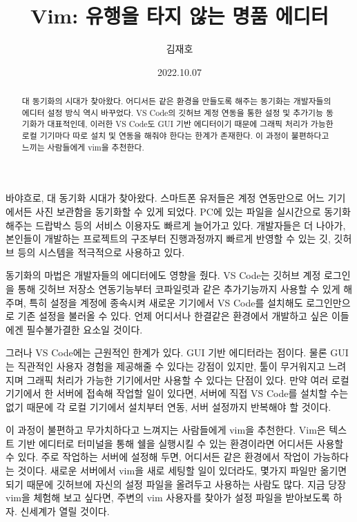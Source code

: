 \documentclass[11pt, oneside]{article}   	%
\title{Vim: 유행을 타지 않는 명품 에디터}
\author{김재호}
\date{2022.10.07}
\begin{document}
\maketitle


\begin{abstract}
    대 동기화의 시대가 찾아왔다. 어디서든 같은 환경을 만들도록 해주는 동기화는 개발자들의 에디터
    설정 방식 역시 바꾸었다. VS Code의 깃허브 계정 연동을 통한 설정 및 추가기능 동기화가 대표적인데,
    이러한 VS Code도 GUI 기반 에디터이기 때문에 그래픽 처리가 가능한 로컬 기기마다 따로 설치
    및 연동을 해줘야 한다는 한계가 존재한다. 이 과정이 불편하다고 느끼는 사람들에게 vim을 추천한다.
\end{abstract}

바야흐로, 대 동기화 시대가 찾아왔다. 스마트폰 유저들은 계정 연동만으로 어느 기기에서든 사진
보관함을 동기화할 수 있게 되었다. PC에 있는 파일을 실시간으로 동기화해주는 드랍박스 등의 서비스
이용자도 빠르게 늘어가고 있다. 개발자들은 더 나아가, 본인들이 개발하는 프로젝트의 구조부터
진행과정까지 빠르게 반영할 수 있는 깃, 깃허브 등의 시스템을 적극적으로 사용하고 있다.

동기화의 마법은 개발자들의 에디터에도 영향을 줬다. VS Code는 깃허브 계정 로그인을 통해 깃허브
저장소 연동기능부터 코파일럿과 같은 추가기능까지 사용할 수 있게 해주며, 특히 설정을 계정에 종속시켜
새로운 기기에서 VS Code를 설치해도 로그인만으로 기존 설정을 불러올 수 있다. 언제 어디서나 한결같은
환경에서 개발하고 싶은 이들에겐 필수불가결한 요소일 것이다.

그러나 VS Code에는 근원적인 한계가 있다. GUI 기반 에디터라는 점이다. 물론 GUI는 직관적인 사용자
경험을 제공해줄 수 있다는 강점이 있지만, 툴이 무거워지고 느려지며 그래픽 처리가 가능한 기기에서만
사용할 수 있다는 단점이 있다. 만약 여러 로컬 기기에서 한 서버에 접속해 작업할 일이 있다면, 서버에
직접 VS Code를 설치할 수는 없기 때문에 각 로컬 기기에서 설치부터 연동, 서버 설정까지 반복해야
할 것이다.

이 과정이 불편하고 무가치하다고 느껴지는 사람들에게 vim을 추천한다. Vim은 텍스트 기반 에디터로
터미널을 통해 쉘을 실행시킬 수 있는 환경이라면 어디서든 사용할 수 있다. 주로 작업하는 서버에
설정해 두면, 어디서든 같은 환경에서 작업이 가능하다는 것이다. 새로운 서버에서 vim을 새로 세팅할
일이 있더라도, 몇가지 파일만 옮기면 되기 때문에 깃허브에 자신의 설정 파일을 올려두고 사용하는
사람도 많다. 지금 당장 vim을 체험해 보고 싶다면, 주변의 vim 사용자를 찾아가 설정 파일을
받아보도록 하자. 신세계가 열릴 것이다.
\end{document}
